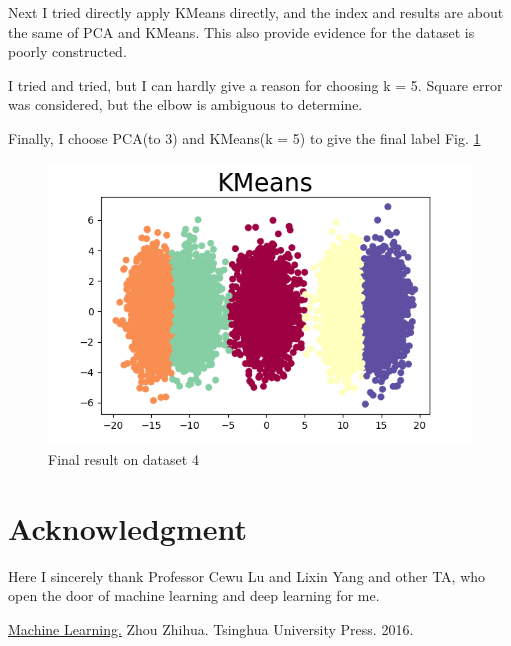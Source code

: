 \documentclass[conference]{IEEEtran}
\begin{document}
Next I tried directly apply KMeans directly, and the index and results are about the same of PCA and KMeans. This also provide evidence for the dataset is poorly constructed.

I tried and tried, but I can hardly give a reason for choosing k = 5. Square error was considered, but the elbow is ambiguous to determine.

Finally, I choose PCA(to 3) and KMeans(k = 5) to give the final label Fig. \ref{P4FIN}

\begin{figure}[htbp]
	\centerline{\includegraphics[scale=0.5]{p4Fin.png}}
	\caption{Final result on dataset 4}
	\label{P4FIN}
\end{figure}

\section*{Acknowledgment}
Here I sincerely thank Professor Cewu Lu and Lixin Yang and other TA, who open the door of machine learning and deep learning for me.

\begin{thebibliography}{00}
 \href{https://books.google.com/books/about/%E6%9C%BA%E5%99%A8%E5%AD%A6%E4%B9%A0.html?id=j0G8nQAACAAJ}{Machine Learning.} Zhou Zhihua. Tsinghua University Press. 2016. \label{b1}
\end{thebibliography}
\end{document}
